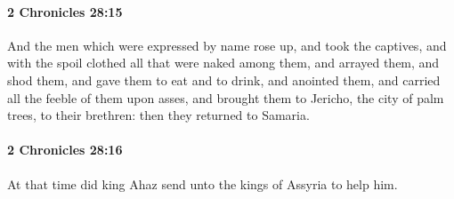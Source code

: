 		\paragraph{2 Chronicles 28:15} %
			\label{2CHRONICLES-28-15}

			And the men which were expressed by name rose up, and took the captives, and with the spoil clothed all that were naked among them, and arrayed them, and shod them, and gave them to eat and to drink, and anointed them, and carried all the feeble of them upon asses, and brought them to Jericho, the city of palm trees, to their brethren: then they returned to Samaria.


		\paragraph{2 Chronicles 28:16} %
			\label{2CHRONICLES-28-16}

			At that time did king Ahaz send unto the kings of Assyria to help him.

